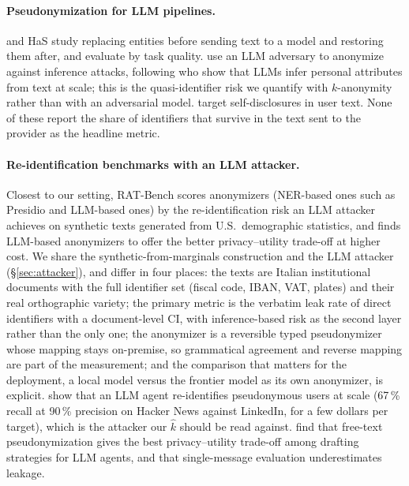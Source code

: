 \documentclass[11pt,a4paper]{article}
\begin{document}
\paragraph{Pseudonymization for LLM pipelines.} \citet{yermilov2023pseudonymization} and HaS \citep{chen2023has} study replacing entities before sending text to a model and restoring them after, and evaluate by task quality. \citet{staab2024anonymizers} use an LLM adversary to anonymize against inference attacks, following \citet{staab2024beyond} who show that LLMs infer personal attributes from text at scale; this is the quasi-identifier risk we quantify with $k$-anonymity rather than with an adversarial model. \citet{dou2024selfdisclosure} target self-disclosures in user text. None of these report the share of identifiers that survive in the text sent to the provider as the headline metric.

\paragraph{Re-identification benchmarks with an LLM attacker.} Closest to our setting, RAT-Bench \citep{krco2026ratbench} scores anonymizers (NER-based ones such as Presidio and LLM-based ones) by the re-identification risk an LLM attacker achieves on synthetic texts generated from U.S.\ demographic statistics, and finds LLM-based anonymizers to offer the better privacy--utility trade-off at higher cost. We share the synthetic-from-marginals construction and the LLM attacker (\S\ref{sec:attacker}), and differ in four places: the texts are Italian institutional documents with the full identifier set (fiscal code, IBAN, VAT, plates) and their real orthographic variety; the primary metric is the verbatim leak rate of direct identifiers with a document-level CI, with inference-based risk as the second layer rather than the only one; the anonymizer is a reversible typed pseudonymizer whose mapping stays on-premise, so grammatical agreement and reverse mapping are part of the measurement; and the comparison that matters for the deployment, a local model versus the frontier model as its own anonymizer, is explicit. \citet{lermen2026deanonymization} show that an LLM agent re-identifies pseudonymous users at scale (67\,\% recall at 90\,\% precision on Hacker News against LinkedIn, for a few dollars per target), which is the attacker our $\hat k$ should be read against. \citet{xiao2026saysomething} find that free-text pseudonymization gives the best privacy--utility trade-off among drafting strategies for LLM agents, and that single-message evaluation underestimates leakage.
\end{document}
